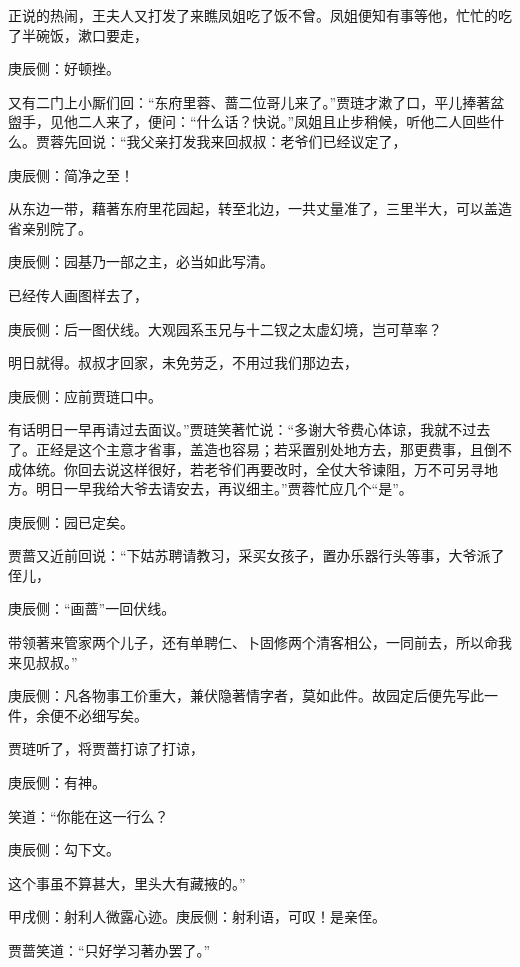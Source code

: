 \begin{parag}
    正说的热闹，王夫人又打发了来瞧凤姐吃了饭不曾。凤姐便知有事等他，忙忙的吃了半碗饭，漱口要走，\begin{note}庚辰侧：好顿挫。\end{note}又有二门上小厮们回：“东府里蓉、蔷二位哥儿来了。”贾琏才漱了口，平儿捧著盆盥手，见他二人来了，便问：“什么话？快说。”凤姐且止步稍候，听他二人回些什么。贾蓉先回说：“我父亲打发我来回叔叔：老爷们已经议定了，\begin{note}庚辰侧：简净之至！\end{note}从东边一带，藉著东府里花园起，转至北边，一共丈量准了，三里半大，可以盖造省亲别院了。\begin{note}庚辰侧：园基乃一部之主，必当如此写清。\end{note}已经传人画图样去了，\begin{note}庚辰侧：后一图伏线。大观园系玉兄与十二钗之太虚幻境，岂可草率？\end{note}明日就得。叔叔才回家，未免劳乏，不用过我们那边去，\begin{note}庚辰侧：应前贾琏口中。\end{note}有话明日一早再请过去面议。”贾琏笑著忙说：“多谢大爷费心体谅，我就不过去了。正经是这个主意才省事，盖造也容易；若采置别处地方去，那更费事，且倒不成体统。你回去说这样很好，若老爷们再要改时，全仗大爷谏阻，万不可另寻地方。明日一早我给大爷去请安去，再议细主。”贾蓉忙应几个“是”。\begin{note}庚辰侧：园已定矣。\end{note}
\end{parag}


\begin{parag}
    贾蔷又近前回说：“下姑苏聘请教习，采买女孩子，置办乐器行头等事，大爷派了侄儿，\begin{note}庚辰侧：“画蔷”一回伏线。\end{note}带领著来管家两个儿子，还有单聘仁、卜固修两个清客相公，一同前去，所以命我来见叔叔。”\begin{note}庚辰侧：凡各物事工价重大，兼伏隐著情字者，莫如此件。故园定后便先写此一件，余便不必细写矣。\end{note}贾琏听了，将贾蔷打谅了打谅，\begin{note}庚辰侧：有神。\end{note}笑道：“你能在这一行么？\begin{note}庚辰侧：勾下文。\end{note}这个事虽不算甚大，里头大有藏掖的。”\begin{note}甲戌侧：射利人微露心迹。庚辰侧：射利语，可叹！是亲侄。\end{note}贾蔷笑道：“只好学习著办罢了。”
\end{parag}


